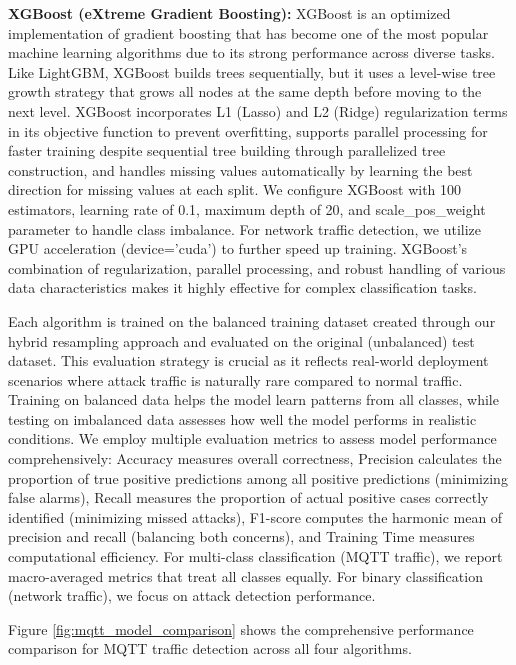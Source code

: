 \documentclass[conference]{IEEEtran}
\begin{document}
\textbf{XGBoost (eXtreme Gradient Boosting):} XGBoost is an optimized implementation of gradient boosting that has become one of the most popular machine learning algorithms due to its strong performance across diverse tasks. Like LightGBM, XGBoost builds trees sequentially, but it uses a level-wise tree growth strategy that grows all nodes at the same depth before moving to the next level. XGBoost incorporates L1 (Lasso) and L2 (Ridge) regularization terms in its objective function to prevent overfitting, supports parallel processing for faster training despite sequential tree building through parallelized tree construction, and handles missing values automatically by learning the best direction for missing values at each split. We configure XGBoost with 100 estimators, learning rate of 0.1, maximum depth of 20, and scale\_pos\_weight parameter to handle class imbalance. For network traffic detection, we utilize GPU acceleration (device='cuda') to further speed up training. XGBoost's combination of regularization, parallel processing, and robust handling of various data characteristics makes it highly effective for complex classification tasks.

Each algorithm is trained on the balanced training dataset created through our hybrid resampling approach and evaluated on the original (unbalanced) test dataset. This evaluation strategy is crucial as it reflects real-world deployment scenarios where attack traffic is naturally rare compared to normal traffic. Training on balanced data helps the model learn patterns from all classes, while testing on imbalanced data assesses how well the model performs in realistic conditions. We employ multiple evaluation metrics to assess model performance comprehensively: Accuracy measures overall correctness, Precision calculates the proportion of true positive predictions among all positive predictions (minimizing false alarms), Recall measures the proportion of actual positive cases correctly identified (minimizing missed attacks), F1-score computes the harmonic mean of precision and recall (balancing both concerns), and Training Time measures computational efficiency. For multi-class classification (MQTT traffic), we report macro-averaged metrics that treat all classes equally. For binary classification (network traffic), we focus on attack detection performance.

Figure \ref{fig:mqtt_model_comparison} shows the comprehensive performance comparison for MQTT traffic detection across all four algorithms.
\end{document}
